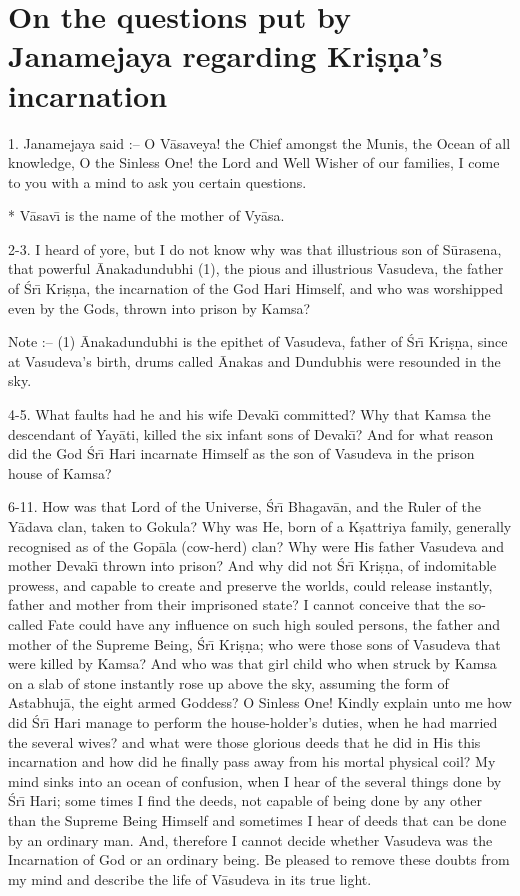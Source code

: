 \chapter{On the questions put by Janamejaya regarding Kri\d{s}\d{n}a's incarnation}

1. Janamejaya said :-- O V\=asaveya! the Chief amongst the Munis, the Ocean of all knowledge, O the Sinless One! the Lord and Well Wisher of our families, I come to you with a mind to ask you certain questions.

* V\=asav\={\i} is the name of the mother of Vy\=asa.

2-3. I heard of yore, but I do not know why was that illustrious son of S\=urasena, that powerful \=Anakadundubhi (1), the pious and illustrious Vasudeva, the father of \'Sr\={\i} Kri\d{s}\d{n}a, the incarnation of the God Hari Himself, and who was worshipped even by the Gods, thrown into prison by Kamsa?

Note :-- (1) \=Anakadundubhi is the epithet of Vasudeva, father of \'Sr\={\i} Kri\d{s}\d{n}a, since at Vasudeva's birth, drums called \=Anakas and Dundubhis were resounded in the sky.

4-5. What faults had he and his wife Devak\={\i} committed? Why that Kamsa the descendant of Yay\=ati, killed the six infant sons of Devak\={\i}? And for what reason did the God \'Sr\={\i} Hari incarnate Himself as the son of Vasudeva in the prison house of Kamsa?

6-11. How was that Lord of the Universe, \'Sr\={\i} Bhagav\=an, and the Ruler of the Y\=adava clan, taken to Gokula? Why was He, born of a K\d{s}attriya family, generally recognised as of the Gop\=ala (cow-herd) clan? Why were His father Vasudeva and mother Devak\={\i} thrown into prison? And why did not \'Sr\={\i} Kri\d{s}\d{n}a, of indomitable prowess, and capable to create and preserve the worlds, could release instantly, father and mother from their imprisoned state? I cannot conceive that the so-called Fate could have any influence on such high souled persons, the father and mother of the Supreme Being, \'Sr\={\i} Kri\d{s}\d{n}a; who were those sons of Vasudeva that were killed by Kamsa? And who was that girl child who when struck by Kamsa on a slab of stone instantly rose up above the sky, assuming the form of Astabhuj\=a, the eight armed Goddess? O Sinless One! Kindly explain unto me how did \'Sr\={\i} Hari manage to perform the house-holder's duties, when he had married the several wives? and what were those glorious deeds that he did in His this incarnation and how did he finally pass away from his mortal physical coil? My mind sinks into an ocean of confusion, when I hear of the several things done by \'Sr\={\i} Hari; some times I find the deeds, not capable of being done by any other than the Supreme Being Himself and sometimes I hear of deeds that can be done by an ordinary man. And, therefore I cannot decide whether Vasudeva was the Incarnation of God or an ordinary being. Be pleased to remove these doubts from my mind and describe the life of V\=asudeva in its true light.

